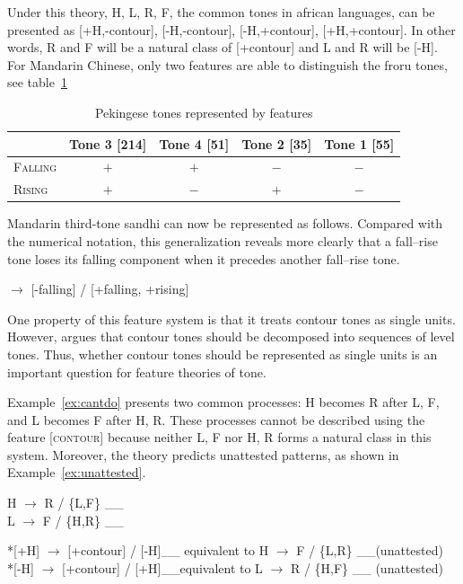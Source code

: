 Under this theory, H, L, R, F, the common tones in african languages,
can be presented as [+H,-contour], [-H,-contour], [-H,+contour], [+H,+contour]. In other words, R
and F will be a natural class of [+contour] and L and R will be [-H].
For Mandarin Chinese, only two features are able to distinguish the
froru tones, see table~\ref{tab:mandarin-tone-features} 

\begin{table}[ht]
    \centering
    \caption{Pekingese tones represented by features}
    \label{tab:mandarin-tone-features}
    \begin{tabular}{lcccc}
        \toprule
        & Tone 3 [214] & Tone 4 [51] & Tone 2 [35] & Tone 1 [55] \\
        \midrule
        \textsc{Falling} & $+$ & $+$ & $-$ & $-$ \\
        \textsc{Rising}  & $+$ & $-$ & $+$ & $-$ \\
        \bottomrule
    \end{tabular}
\end{table}

Mandarin third-tone sandhi can now be represented as follows. 
Compared with the numerical notation, this generalization 
reveals more clearly that a fall--rise tone loses its falling 
component when it precedes another fall--rise tone.

\ex
\text{[+falling]} $\rightarrow$ [-falling] /
  [+falling, +rising]
\xe

One property of this feature system is that it treats contour tones as
single units. However,  argues that contour tones should 
be decomposed into sequences of level tones. Thus, whether contour 
tones should be represented as single units is an important question 
for feature theories of tone.

Example~\ref{ex:cantdo} presents two common processes: H becomes R 
after {L, F}, and L becomes F after {H, R}. These processes cannot be
described using the feature \textsc{[contour]} because neither {L, F}
nor {H, R} forms a natural class in this system. Moreover, the theory
predicts unattested patterns, as shown in Example~\ref{ex:unattested}.

\ex \label{ex:cantdo}
H $\rightarrow$ R / \{L,F\} \_\_\\
L $\rightarrow$ F / \{H,R\} \_\_
\xe 

\ex \label{ex:unattested}
*[+H] $\rightarrow$ [+contour] / [-H]\_\_  \hfill equivalent to H $\rightarrow$ F / \{L,R\} \_\_\hfill(unattested)\\
*[-H] $\rightarrow$ [+contour] / [+H]\_\_\hfill   equivalent to L $\rightarrow$ R / \{H,F\} \_\_ \hfill(unattested)
\xe

